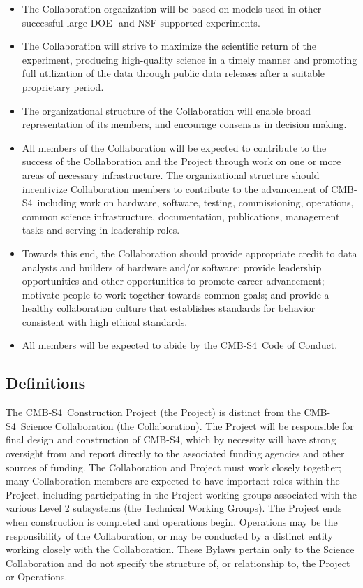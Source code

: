 \documentclass[12pt]{article}
\newcommand\collabname{CMB-S4}
\begin{document}
\begin{itemize}
\item The Collaboration organization will be based on models used in other successful  large DOE- and NSF-supported experiments.

\item The Collaboration will strive to maximize the scientific return of the experiment, producing high-quality science in a timely manner and promoting full utilization of the data through public data releases after a suitable proprietary period.

\item The organizational structure of the Collaboration will enable broad representation of its members, and encourage consensus in decision making.

\item All members of the Collaboration will be expected to contribute to the success of the Collaboration and the Project through work on one or more areas of necessary infrastructure. The organizational structure should incentivize Collaboration members to contribute to the advancement of \collabname\  including work on hardware, software, testing, commissioning, operations, common science infrastructure, documentation,  publications,  management tasks and serving in leadership roles.

\item Towards this end, the Collaboration should provide appropriate credit to data analysts and builders of hardware and/or software; provide leadership opportunities and other opportunities to promote career advancement; motivate people to work together towards common goals; and provide a healthy collaboration culture that establishes standards for behavior consistent with high ethical standards.

\item All members will be expected to abide by the \collabname\ Code of Conduct.

\end{itemize}

\subsection{Definitions}

The \collabname\ Construction Project (the Project) is distinct from the \collabname\ Science Collaboration (the Collaboration). The Project will be responsible for final design and construction of \collabname, which by necessity will have strong oversight from and  report directly to the associated funding agencies and other sources of funding. The Collaboration and Project must work closely together; many Collaboration members are expected to have important roles within the Project, including participating in the Project working groups associated with the various Level 2 subsystems (the Technical Working Groups). The Project ends when construction is completed and operations begin. Operations may be the responsibility of the Collaboration, or may be conducted by a distinct entity working closely with the Collaboration. These Bylaws pertain only to the Science Collaboration and do not specify the structure of, or relationship to, the Project or Operations.
\end{document}
